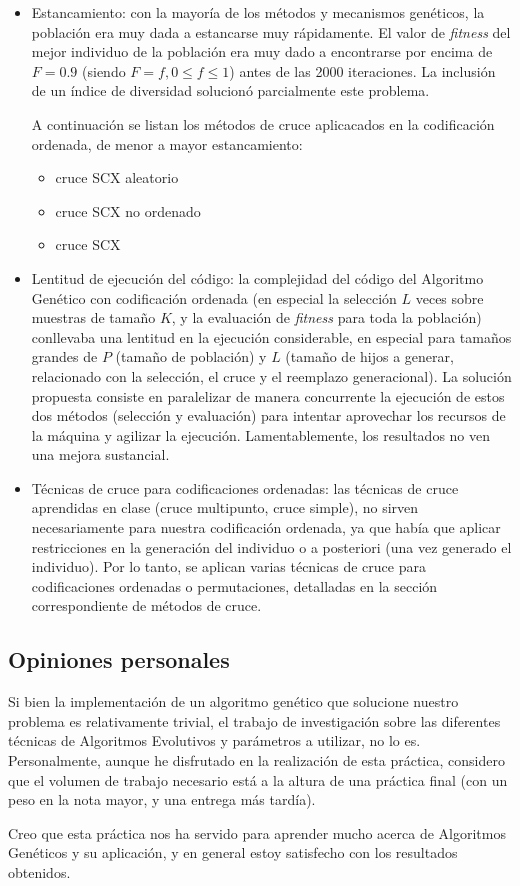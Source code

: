 \documentclass[12pt]{article}
\begin{document}
\begin{itemize}
    \item Estancamiento: con la mayoría de los métodos y mecanismos genéticos, la población era muy dada a estancarse muy rápidamente. El valor de \emph{fitness} del mejor individuo de la población era muy dado a encontrarse por encima de $F=0.9$ (siendo $F=f, 0\le f\le1$) antes de las 2000 iteraciones. La inclusión de un índice de diversidad solucionó parcialmente este problema.

    A continuación se listan los métodos de cruce aplicacados en la codificación ordenada, de menor a mayor estancamiento:
    \begin{itemize}
        \item cruce SCX aleatorio
        \item cruce SCX no ordenado
        \item cruce SCX
    \end{itemize}
    \item Lentitud de ejecución del código: la complejidad del código del Algoritmo Genético con codificación ordenada (en especial la selección $L$ veces sobre muestras de tamaño $K$, y la evaluación de \emph{fitness} para toda la población) conllevaba una lentitud en la ejecución considerable, en especial para tamaños grandes de $P$ (tamaño de población) y $L$ (tamaño de hijos a generar, relacionado con la selección, el cruce y el reemplazo generacional). La solución propuesta consiste en paralelizar de manera concurrente la ejecución de estos dos métodos (selección y evaluación) para intentar aprovechar los recursos de la máquina y agilizar la ejecución. Lamentablemente, los resultados no ven una mejora sustancial.
    \item Técnicas de cruce para codificaciones ordenadas: las técnicas de cruce aprendidas en clase (cruce multipunto, cruce simple), no sirven necesariamente para nuestra codificación ordenada, ya que había que aplicar restricciones en la generación del individuo o a posteriori (una vez generado el individuo). Por lo tanto, se aplican varias técnicas de cruce para codificaciones ordenadas o permutaciones, detalladas en la sección correspondiente de métodos de cruce.
\end{itemize}

\subsection{Opiniones personales}

Si bien la implementación de un algoritmo genético que solucione nuestro problema es relativamente trivial, el trabajo de investigación sobre las diferentes técnicas de Algoritmos Evolutivos y parámetros a utilizar, no lo es. Personalmente, aunque he disfrutado en la realización de esta práctica, considero que el volumen de trabajo necesario está a la altura de una práctica final (con un peso en la nota mayor, y una entrega más tardía).

Creo que esta práctica nos ha servido para aprender mucho acerca de Algoritmos Genéticos y su aplicación, y en general estoy satisfecho con los resultados obtenidos.
\end{document}
